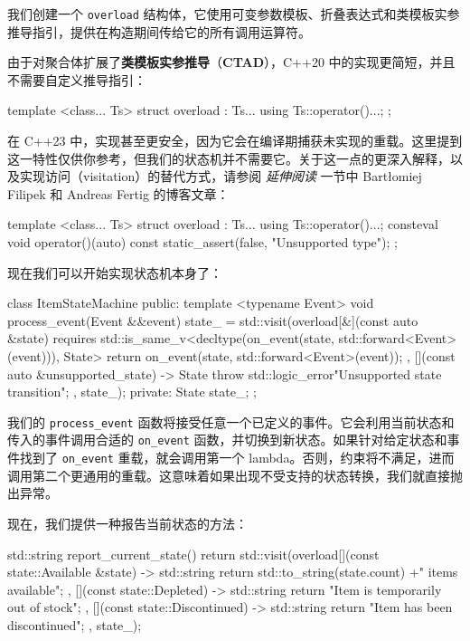 \label{idx:594}
我们创建一个 \texttt{overload} 结构体，它使用可变参数模板、折叠表达式和类模板实参推导指引，提供在构造期间传给它的所有调用运算符。

\label{idx:595}
由于对聚合体扩展了\textbf{类模板实参推导}（\textbf{CTAD}），C++20 中的实现更简短，并且不需要自定义推导指引：

\begin{codebox}[cpp]
template <class... Ts>
struct overload : Ts... {
    using Ts::operator()...;
};
\end{codebox}

在 C++23 中，实现甚至更安全，因为它会在编译期捕获未实现的重载。这里提到这一特性仅供你参考，但我们的状态机并不需要它。关于这一点的更深入解释，以及实现访问（visitation）的替代方式，请参阅 \emph{延伸阅读} 一节中 Bartłomiej Filipek 和 Andreas Fertig 的博客文章：

\begin{codebox}[cpp]
template <class... Ts>
struct overload : Ts... {
    using Ts::operator()...;
    consteval void operator()(auto) const {
        static_assert(false, "Unsupported type");
    }
};
\end{codebox}

\label{idx:596}
现在我们可以开始实现状态机本身了：

\begin{codebox}[cpp]
class ItemStateMachine {
public:
    template <typename Event> void process_event(Event &&event) {
        state_ = std::visit(overload{[&](const auto &state) requires std::is_same_v<decltype(on_event(state, std::forward<Event>(event))), State>{
            return on_event(state, std::forward<Event>(event));
        },
        [](const auto &unsupported_state) -> State {
            throw std::logic_error{"Unsupported state transition"};
        }
    },
    state_);
}
private:
    State state_;
};
\end{codebox}

我们的 \texttt{process\_\allowbreak{}event} 函数将接受任意一个已定义的事件。它会利用当前状态和传入的事件调用合适的 \texttt{on\_event} 函数，并切换到新状态。如果针对给定状态和事件找到了 \texttt{on\_event} 重载，就会调用第一个 lambda。否则，约束将不满足，进而调用第二个更通用的重载。这意味着如果出现不受支持的状态转换，我们就直接抛出异常。

现在，我们提供一种报告当前状态的方法：

\begin{codebox}[cpp]
std::string report_current_state() {
    return std::visit(overload{[](const state::Available &state) -> std::string {
        return std::to_string(state.count) +" items available";
        },
        [](const state::Depleted) -> std::string {
           return "Item is temporarily out of stock";
        },
        [](const state::Discontinued) -> std::string {
            return "Item has been discontinued";
        }
    },
    state_);
}
\end{codebox}

